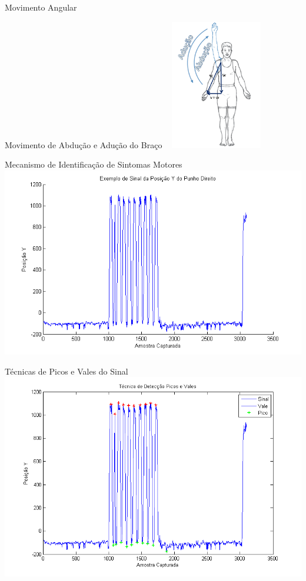 \documentclass{beamer}
\begin{document}
\begin{frame}{Movimento Angular}
  \begin{block}{Movimento de Abdução e Adução do Braço ~\cite{mcginnis2013biomechanics}}
      \center \includegraphics[width=4cm]{img/abducao-angulo.png}
  \end{block}
\end{frame}

\begin{frame}{Mecanismo de Identificação de Sintomas Motores}
      \center \includegraphics[height=3 in]{img/exsinalposicaoypunhodireito.png}
\end{frame}

\begin{frame}{Técnicas de Picos e Vales do Sinal}
      \center \includegraphics[height=3 in]{img/deteccaopicosvales.png}
\end{frame}
\end{document}
